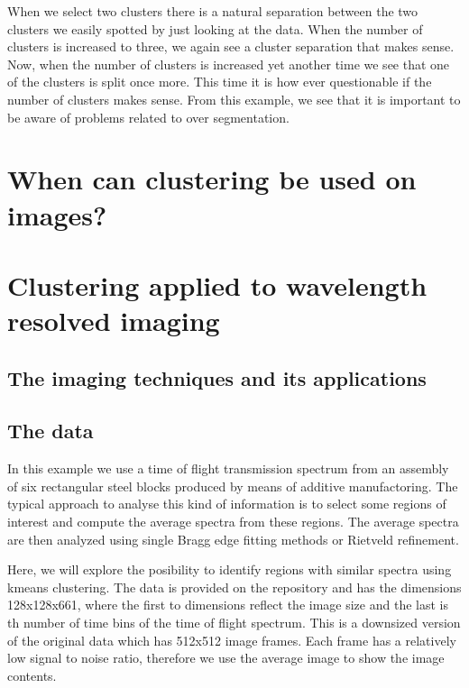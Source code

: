 \documentclass[letterpaper,10pt,english]{sphinxmanual}
\begin{document}
\noindent{}

When we select two clusters there is a natural separation between the two clusters we easily spotted by just looking at the data. When the number of clusters is increased to three, we again see a cluster separation that makes sense. Now, when the number of clusters is increased yet another time we see that one of the clusters is split once more. This time it is how ever questionable if the number of clusters makes sense. From this example, we see that it is important to be aware of problems related to over segmentation.


\section{When can clustering be used on images?}
\label{\detokenize{ML4NeutronImageSegmentation:when-can-clustering-be-used-on-images}}

\section{Clustering applied to wavelength resolved imaging}
\label{\detokenize{ML4NeutronImageSegmentation:clustering-applied-to-wavelength-resolved-imaging}}

\subsection{The imaging techniques and its applications}
\label{\detokenize{ML4NeutronImageSegmentation:the-imaging-techniques-and-its-applications}}

\subsection{The data}
\label{\detokenize{ML4NeutronImageSegmentation:the-data}}
In this example we use a time of flight transmission spectrum from an assembly of six rectangular steel blocks produced by means of additive manufactoring. The typical approach to analyse this kind of information is to select some regions of interest and compute the average spectra from these regions. The average spectra are then analyzed using single Bragg edge fitting methods or Rietveld refinement.

Here, we will explore the posibility to identify regions with similar spectra using k\sphinxhyphen{}means clustering. The data is provided on the repository and has the dimensions 128x128x661, where the first to dimensions reflect the image size and the last is th number of time bins of the time of flight spectrum. This is a downsized version of the original data which has 512x512 image frames. Each frame has a relatively low signal to noise ratio, therefore we use the average image  to show the image contents.
\end{document}
